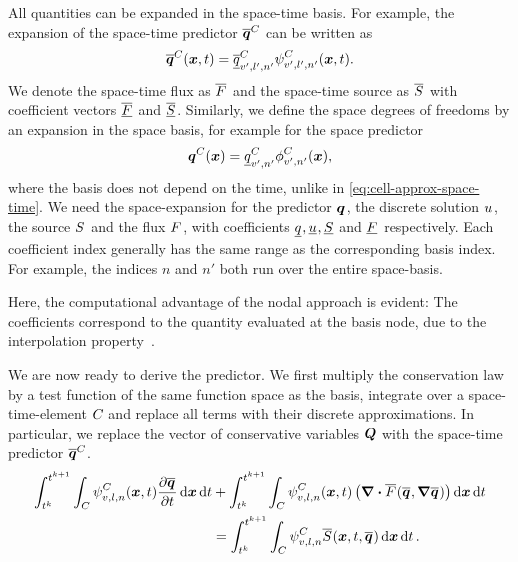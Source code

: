 All quantities can be expanded in the space-time basis.
For example, the expansion of the space-time predictor $\stpredictor[\cell]$ can be written as
\begin{equation}
  \label{eq:cell-approx-space-time}
  \stpredictor[\cell] (\bm{x}, t) = \stpredictorCoeff[\cell][v',l',n'] \stbasis[\cell][v',l',n'](\bm{x}, t).
\end{equation}
We denote the space-time flux as $\stflux$ and the space-time source as $\stsource$ with coefficient vectors $\stfluxCoeff$ and $\stsourceCoeff$.
Similarly, we define the space degrees of freedoms by an expansion in the space basis, for example for the space predictor
\begin{equation}
  \label{eq:cell-approx-space}
  \spredictor[\cell] (\bm{x}) = \spredictorCoeff[\cell][v',n'] \sbasis[\cell][v',n'] (\bm{x}),
\end{equation}
where the basis does not depend on the time, unlike in \cref{eq:cell-approx-space-time}.
We need the space-expansion for the predictor $\spredictor$, the discrete solution $\ssol$, the source $\ssource$ and the flux $\sflux$,
with coefficients $\spredictorCoeff, \ssolCoeff, \ssourceCoeff$ and $\sfluxCoeff$ respectively.
Each coefficient index generally has the same range as the corresponding basis index.
For example, the indices $n$ and $n'$ both run over the entire space-basis.

Here, the computational advantage of the nodal approach is evident:
The coefficients correspond to the quantity evaluated at the basis node, due to the interpolation property~.

We are now ready to derive the predictor.
We first multiply the conservation law by a test function of the same function space as the basis, integrate over a space-time-element $C_{}$ and replace all terms with their discrete approximations.
In particular, we replace the vector of conservative variables $\bm{Q}$ with the space-time predictor $\stpredictor[\cell]$.
\begin{align}\label{eq:weak-pde-space-time}
\begin{split}
\intdt{\intdcell{
    \sttestfunction[\cell][v,l,n](\bm{x}, t)
    \pdv{\stpredictor}{t}
}}
&+
\intdt{\intdcell{
    \sttestfunction[\cell][v,l,n](\bm{x}, t)
    \left(
      \divergence{\stflux(\stpredictor, \gradient{\stpredictor})}
    \right)
}}
\\&=
\intdt{\intdcell{
  \sttestfunction[\cell][v,l,n] \stsource(\bm{x}, t, \stpredictor)
}}.
\end{split}
\end{align}

